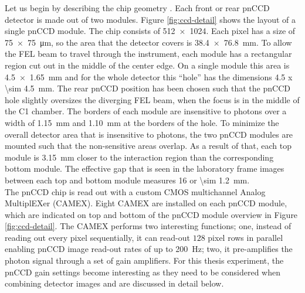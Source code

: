 %
Let us begin by describing the chip geometry \citep{Bucher-2016-Unpublished}. Each front or rear pnCCD detector is made out of two modules. Figure \ref{fig:ccd-detail} shows the layout of a single pnCCD module. The chip consists of \SI{512 x 1024}{\pixels}. Each pixel has a size of \SI{75 x 75}{\micro\meter}, so the area that the detector covers is \SI{38.4 x 76.8}{\milli\meter}. To allow the FEL beam to travel through the instrument, each module has a rectangular region cut out in the middle of the center edge. On a single module this area is \SI{4.5 x 1.65}{\milli\meter} and for the whole detector this ``hole'' has the dimensions \SI{4.5 x \sim 4.5}{\milli\meter}. The rear pnCCD position has been chosen such that the pnCCD hole slightly oversizes the diverging FEL beam, when the focus is in the middle of the C1 chamber. The borders of each module are insensitive to photons over a width of \SI{1.15}{\milli\meter} and \SI{1.10}{\milli\meter} at the borders of the hole. To minimize the overall detector area that is insensitive to photons, the two pnCCD modules are mounted such that the non-sensitive areas overlap. As a result of that, each top module is \SI{3.15}{\milli\meter} closer to the interaction region than the corresponding bottom module. The effective gap that is seen in the laboratory frame images between each top and bottom module measures \SI{16}{\pixels} or \SI{\sim 1.2}{\milli\meter}.\\[1\baselineskip]
%
The pnCCD chip is read out with a custom CMOS multichannel Analog MultiplEXer (CAMEX). Eight CAMEX are installed on each pnCCD module, which are indicated on top and bottom of the pnCCD module overview in Figure \ref{fig:ccd-detail}. The CAMEX performs two interesting functions; one, instead of reading out every pixel sequentially, it can read-out $128$ pixel rows in parallel enabling pnCCD image read-out rates of up to \SI{200}{\hertz}; two, it pre-amplifies the photon signal through a set of gain amplifiers. For this thesis experiment, the pnCCD gain settings become interesting as they need to be considered when combining detector images and are discussed in detail below.\\[1\baselineskip]
